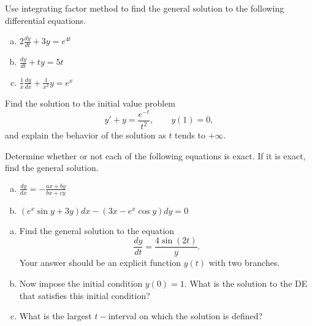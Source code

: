 \documentclass[12pt,letterpaper]{hmcpset}
\begin{document}

\begin{problem}[B1]
    Use integrating factor method to find
    the general solution to the following
    differential equations.

    \begin{enumerate}[(a)]
        \item $2\frac{dy}{dt} + 3y = e^{4t}$
        \item $\frac{dy}{dt} + ty = 5t$
        \item $\frac{1}{x}\frac{dy}{dx} + \frac{1}{x^2}y = e^x$
    \end{enumerate}
\end{problem}

\begin{solution}
    \vfill
\end{solution}
\clearpage

\begin{problem}[B2]
    Find the solution to the initial value problem
    \[
        y' + y = \frac{e^{-t}}{t^2}, \qquad y(1)=0,
    \]
    and explain the behavior of the solution as $t$ 
    tends to $+\infty$.
\end{problem}

\begin{solution}
    \vfill
\end{solution}
\clearpage

\begin{problem}[B3]
    Determine whether or not each of the
    following equations is exact. If it 
    is exact, find the general solution.
    \begin{enumerate}[(a)]
        \item $\frac{dy}{dx} = -\frac{ax+by}{bx+cy}$
        \item $(e^x\sin y + 3y)dx - (3x-e^x\cos y)dy = 0$
    \end{enumerate}
\end{problem}

\begin{solution}
    \vfill
\end{solution}
\clearpage

\begin{problem}[B4]
    \begin{enumerate}[(a)]
        \item Find the general solution to the equation
            \[
                \frac{dy}{dt} = \frac{4\sin(2t)}{y}.
            \]
            Your answer should be an explicit function
            $y(t)$ with two branches.
        \item Now impose the initial condition $y(0) = 1$.
            What is the solution to the DE that satisfies
            this initial condition?
        \item What is the largest $t-$interval on which the
            solution is defined?
    \end{enumerate}
\end{problem}
\end{document}
